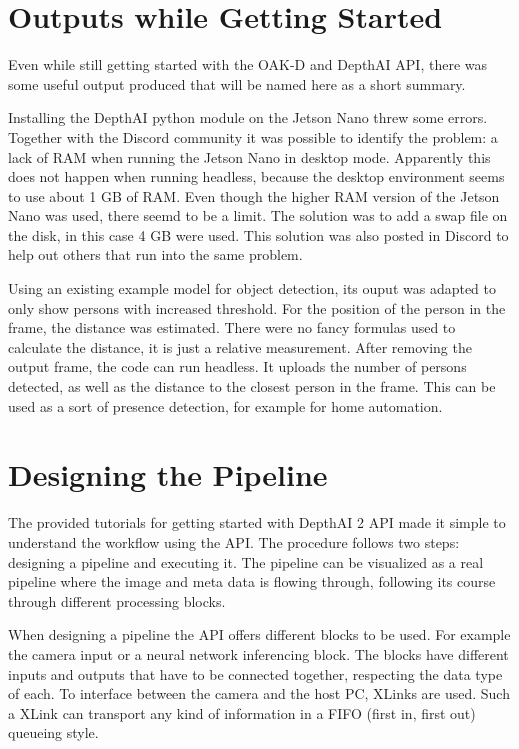 \documentclass[a4paper,titlepage]{article}
\begin{document}
\newpage
\section{Outputs while Getting Started}

Even while still getting started with the OAK-D and DepthAI API, there was some useful output produced that will be named here as a short summary.

Installing the DepthAI python module on the Jetson Nano threw some errors.
Together with the Discord community it was possible to identify the problem: a lack of RAM when running the Jetson Nano in desktop mode.
Apparently this does not happen when running headless, because the desktop environment seems to use about 1 GB of RAM.
Even though the higher RAM version of the Jetson Nano was used, there seemd to be a limit.
The solution was to add a swap file on the disk, in this case 4 GB were used.
This solution was also posted in Discord to help out others that run into the same problem.

Using an existing example model for object detection, its ouput was adapted to only show persons with increased threshold.
For the position of the person in the frame, the distance was estimated.
There were no fancy formulas used to calculate the distance, it is just a relative measurement.
After removing the output frame, the code can run headless.
It uploads the number of persons detected, as well as the distance to the closest person in the frame.
This can be used as a sort of presence detection, for example for home automation.

\newpage
\section{Designing the Pipeline}

The provided tutorials for getting started with DepthAI 2 API made it simple to understand the workflow using the API.
The procedure follows two steps: designing a pipeline and executing it.
The pipeline can be visualized as a real pipeline where the image and meta data is flowing through, following its course through different processing blocks.

When designing a pipeline the API offers different blocks to be used.
For example the camera input or a neural network inferencing block.
The blocks have different inputs and outputs that have to be connected together, respecting the data type of each.
To interface between the camera and the host PC, XLinks are used.
Such a XLink can transport any kind of information in a FIFO (first in, first out) queueing style.
\end{document}
